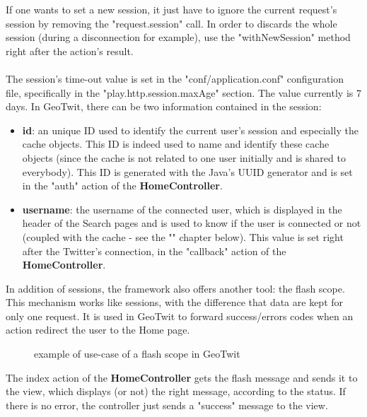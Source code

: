 \documentclass[a4paper,11pt]{report}
\begin{document}
If one wants to set a new session, it just have to ignore the current request's session by removing the "request.session" call. In order to discards the whole session (during a disconnection for example), use the "withNewSession" method right after the action's result.\\\\
The session's time-out value is set in the "conf/application.conf" configuration file, specifically in the "play.http.session.maxAge" section. The value currently is 7 days.
\newpage
In GeoTwit, there can be two information contained in the session:
\begin{itemize}
	\item \textbf{id}: an unique ID used to identify the current user's session and especially the cache objects. This ID is indeed used to name and identify these cache objects (since the cache is not related to one user initially and is shared to everybody). This ID is generated with the Java's UUID generator and is set in the "auth" action of the \textbf{HomeController}.
	\item \textbf{username}: the username of the connected user, which is displayed in the header of the Search pages and is used to know if the user is connected or not (coupled with the cache - see the "" chapter below). This value is set right after the Twitter's connection, in the "callback" action of the \textbf{HomeController}.
\end{itemize}

In addition of sessions, the framework also offers another tool: the flash scope. This mechanism works like sessions, with the difference that data are kept for only one request. It is used in GeoTwit to forward success/errors codes when an action redirect the user to the Home page.
\begin{figure}[H]
\vspace{-5pt}
\begin{center}
\vspace{-20pt}
\caption{example of use-case of a flash scope in GeoTwit}
\end{center}
\end{figure}
\vspace{-10pt}

The index action of the \textbf{HomeController} gets the flash message and sends it to the view, which displays (or not) the right message, according to the status. If there is no error, the controller just sends a "success" message to the view.
\end{document}
